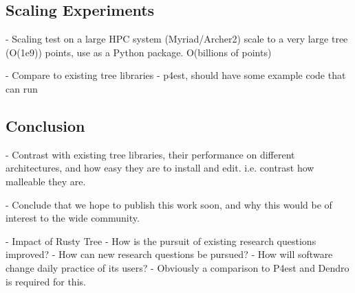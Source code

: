 \subsection*{Scaling Experiments}

- Scaling test on a large HPC system (Myriad/Archer2) scale to a very large tree (O(1e9)) points, use as a Python package.  O(billions of points)

- Compare to existing tree libraries
    - p4est, should have some example code that can run

\subsection*{Conclusion}

- Contrast with existing tree libraries, their performance on different architectures, and how easy they are to install and edit. i.e. contrast how malleable they are.

- Conclude that we hope to publish this work soon, and why this would be of interest to the wide community.

- Impact of Rusty Tree
    - How is the pursuit of existing research questions improved?
    - How can new research questions be pursued?
    - How will software change daily practice of its users?
        - Obviously a comparison to P4est and Dendro is required for this.
